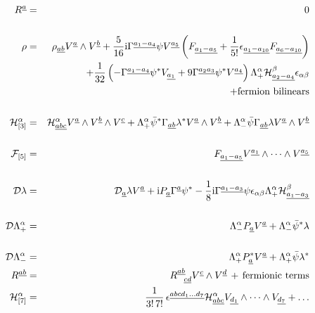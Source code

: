 \documentclass[a4paper,11pt]{article}
\begin{document}
\begin{eqnarray}
 R^{\underline{a}}&=&0\nonumber\\&{}\label{torpar}\\
 \rho&=&\rho_{\underline{ab}} V^{\underline{a}} \wedge V^{\underline{b}}
      + {5\over 16}{\rm i}\Gamma^{\underline{a_1-a_4}} \psi V^{\underline{a_5}} \left(
          F_{\underline{a_1-a_5}}
          +{1\over5!}\epsilon_{\underline{a_1-a_{10}}}F_{\underline{a_6-a_{10}}}
        \right)\nonumber\\
     & &+{1\over 32}\left(
         -\Gamma^{\underline{a_1-a_4}}\psi^*V_{\underline{a_1}}
         +9\Gamma^{\underline{a_2a_3}}\psi^*V^{\underline{a_4}}
       \right)\Lambda^{\alpha}_+\mathcal{H}^{\beta}_{\underline{a_2-a_4}} \epsilon_{\alpha\beta}\nonumber\\
     & &+\mbox{fermion bilinears}\label{rhopar}\\
&{}&\nonumber\\
 \mathcal{H}^{\alpha}_{[3]}&=&
     \mathcal{H}^{\alpha}_{\underline{abc}} V^{\underline{a}} \wedge V^{\underline{b}} \wedge
     V^{\underline{c}}
    +\Lambda^{\alpha}_+ {\bar \psi}^* \Gamma_{\underline{ab}}\lambda^* V^{\underline{a}} \wedge
    V^{\underline{b}}
    +\Lambda^{\alpha}_- {\bar \psi} \Gamma_{\underline{ab}} \lambda V^{\underline{a}} \wedge V^{\underline{b}}
    \label{Hpar}\\
&{}&\nonumber\\
\mathcal{F}_{[5]}&=&F_{\underline{a_1-a_5}}V^{\underline{a_1}}
\wedge \dots \wedge V^{\underline{a_5}}\label{f5par}\\&{}\nonumber\\
{\cal D} \lambda&=&
   {\cal D}_{\underline{a}}\lambda V^{\underline{a}}
   +{\rm i} P_{\underline{a}} \Gamma^{\underline{a}} \psi^*
   -{1 \over 8}{\rm i}\Gamma^{\underline{a_1-a_3}} \psi
      \epsilon_{\alpha\beta}\Lambda^{\alpha}_+\mathcal{H}^{\beta}_{\underline{a_1-a_3}}
      \label{dilatinpar}\\&{}&\nonumber\\
{\cal D}\Lambda^{\alpha}_+&=&
    \Lambda^{\alpha}_- P_{\underline{a}}V^{\underline{a}}
    + \Lambda^{\alpha}_-{\bar \psi}^* \lambda
\label{GsuHpar1}\\&{}&\nonumber\\
{\cal D}\Lambda^{\alpha}_-&=&
   \Lambda^{\alpha}_+P_{\underline{a}}^*V^{\underline{a}}
   + \Lambda^{\alpha}_+{\bar \psi}\lambda^*
\label{GsuHpar2}\\
R^{\underline{ab}}&=&R^{\underline{ab}}_{~~\underline{cd}} V^{\underline{c}} \wedge V^{\underline{d}} \,
+ \, \mbox{fermionic
terms}\label{lorenpar}\\
\mathcal{H}^{\alpha}_{[7]}&=& \frac{1}{3! \, 7!} \,
     \epsilon^{\underline{abcd_1\dots d_7}}\mathcal{H}^{\alpha}_{\underline{abc}}
     V_{\underline{d_1}} \wedge \dots \wedge
     V_{\underline{d_7}}
    +\dots
    \label{H7par}\\
&{}&\nonumber\\
\end{eqnarray}
\end{document}
